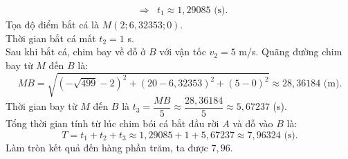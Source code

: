 \begin{ex}
{\begin{eqnarray*}
			&\Rightarrow& t_1 \approx 1{,}29085 \text{ (s)}.
		\end{eqnarray*}
		Tọa độ điểm bắt cá là $M(2;6{,}32353;0)$.\\
		Thời gian bắt cá mất $t_2 = 1$ s.\\
		Sau khi bắt cá, chim bay về đỗ ở $B$ với vận tốc $v_2 = 5$ m/s. Quãng đường chim bay từ $M$ đến $B$ là:
		\[MB = \sqrt{\left(-\sqrt{499} - 2\right)^2 + (20 - 6{,}32353)^2 + (5 - 0)^2} \approx 28{,}36184 \text{ (m)}. \]
		Thời gian bay từ $M$ đến $B$ là $t_3 = \dfrac{MB}{5} \approx \dfrac{28{,}36184}{5} \approx 5{,}67237$ (s).\\
		Tổng thời gian tính từ lúc chim bói cá bắt đầu rời $A$ và đỗ vào $B$ là:
		\[T = t_1 + t_2 + t_3 \approx 1{,}29085 + 1 + 5{,}67237 \approx 7{,}96324 \text{ (s)}. \]
		Làm tròn kết quả đến hàng phần trăm, ta được $7{,}96$.
	}
\end{ex}

